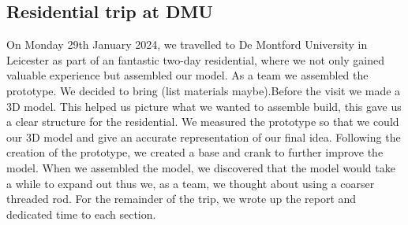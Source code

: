 \documentclass[a4paper,10pt]{article}
\begin{document}
\subsection{Residential trip at \gls{DMU}}
On Monday 29th January 2024, we travelled to De Montford University in Leicester as part of an fantastic two-day residential, where we not only gained valuable experience but assembled our model. As a team we assembled the prototype. We decided to bring (list materials maybe).Before the visit we made a 3D model. This helped us picture what we wanted to assemble build, this gave us a clear structure for the residential.  We measured the prototype so that we could our 3D model and give an accurate representation of our final idea. Following the creation of the prototype, we created a base and crank to further improve the model. When we assembled the model, we discovered that the model would take a while to expand out thus we, as a team, we thought about using a coarser threaded rod. For the remainder of the trip, we wrote up the report and dedicated time to each section.



\pagebreak
\printglossaries
\end{document}
